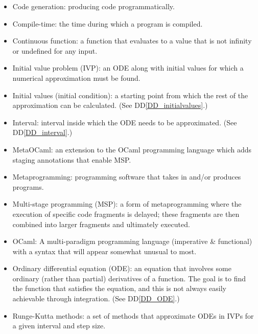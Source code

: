 \documentclass[12pt]{article}
\newcommand{\ddref}[1]{DD\ref{#1}}
\begin{document}
\begin{itemize}

\item Code generation: producing code programmatically.

\item Compile-time: the time during which a program is compiled.

\item Continuous function: a function that evaluates to a value that is not 
infinity or undefined for any input.

\item Initial value problem (IVP): an ODE along with initial values for which a 
numerical approximation must be found.

\item Initial values (initial condition): a starting point from which the rest 
of the approximation 
can be calculated. (See \ddref{DD_initialvalues}.)

\item Interval: interval inside which the ODE needs to be approximated. (See 
\ddref{DD_interval}.)

\item MetaOCaml: an extension to the OCaml programming language which adds 
staging annotations that enable MSP.

\item Metaprogramming: programming software that takes in and/or produces 
programs.

\item Multi-stage programming (MSP): a form of metaprogramming where the 
execution of specific code fragments is delayed; these fragments are then 
combined into larger fragments and ultimately executed.

\item OCaml: A multi-paradigm programming language (imperative \& functional) 
with a syntax that will appear somewhat unusual to most.

\item Ordinary differential equation (ODE): an equation that involves some 
ordinary (rather than partial) derivatives of a function. The goal is to find 
the function that satisfies the equation, and this is not always easily 
achievable through integration. (See \ddref{DD_ODE}.)

\item Runge-Kutta methods: a set of methods that approximate ODEs in IVPs for a 
given interval and step size.


\end{itemize}
\end{document}
